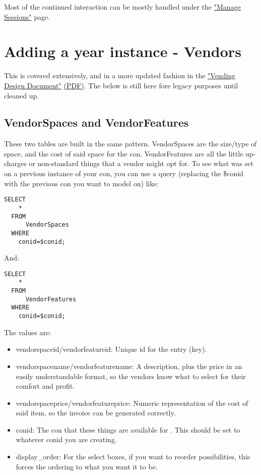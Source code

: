 \documentclass[captions=tablesignature]{scrartcl}
\begin{document}
Most of the continued interaction can be mostly handled under the
\href{../webpages/StaffManageSessions.php}{"Manage Sessions"} page.

\section{Adding a year instance - Vendors}
\label{sec-14}

This is covered extensively, and in a more updated fashion in the
\href{./Vending_Design_Document.html}{"Vending Design Document"} \href{./Vending_Design_Document.pdf}{(PDF)}.  The below is still here fore
legacy purposes until cleaned up.
\subsection{VendorSpaces and VendorFeatures}
\label{sec-14-1}
These two tables are built in the same pattern. VendorSpaces are
the size/type of space, and the cost of said space for the con.
VendorFeatures are all the little up-charges or non-standard things
that a vendor might opt for.  To see what was set on a previous
instance of your con, you can use a query (replacing the \$conid
with the previous con you want to model on) like:
\begin{verbatim}
SELECT
    *
  FROM
      VendorSpaces
  WHERE
    conid=$conid;
\end{verbatim}
And:
\begin{verbatim}
SELECT
    *
  FROM
      VendorFeatures
  WHERE
    conid=$conid;
\end{verbatim}
The values are:
\begin{itemize}
\item vendorspaceid/vendorfeatureid: Unique id for the entry (key).
\item vendorspacename/vendorfeaturename: A description, plus the price
in an easily understandable format, so the vendors know what to
select for their comfort and profit.
\item vendorspaceprice/vendorfeatureprice: Numeric representation of
the cost of said item, so the invoice can be generated
correctly.
\item conid: The con that these things are available for .  This should
be set to whatever conid you are creating.
\item display\_order: For the select boxes, if you want to reorder
possibilities, this forces the ordering to what you want it to
be.
\end{itemize}
\end{document}

